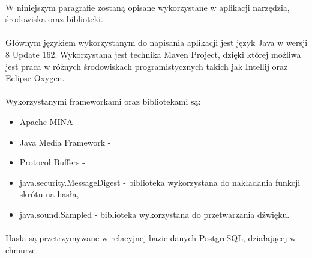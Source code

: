 \documentclass[12pt,a4paper,notitlepage]{report}
\begin{document}
	\paragraph*{} W niniejszym paragrafie zostaną opisane wykorzystane w aplikacji narzędzia, środowiska oraz biblioteki.
	\paragraph*{} Głównym językiem wykorzystanym do napisania aplikacji jest język Java w wersji 8 Update 162. Wykorzystana jest technika Maven Project, dzięki której możliwa jest praca w różnych środowiskach programistycznych takich jak Intellij oraz Eclipse Oxygen.
	\paragraph*{} Wykorzystanymi frameworkami oraz bibliotekami są:
	\begin{itemize}
		\item Apache MINA - 
		\item Java Media Framework - 
		\item Protocol Buffers - 
		\item java.security.MessageDigest - biblioteka wykorzystana do nakładania funkcji skrótu na hasła,
		\item java.sound.Sampled - biblioteka wykorzystana do przetwarzania dźwięku.
	\end{itemize}
	\paragraph*{} Hasła są przetrzymywane w relacyjnej bazie danych PostgreSQL, działającej w chmurze.
\end{document}
